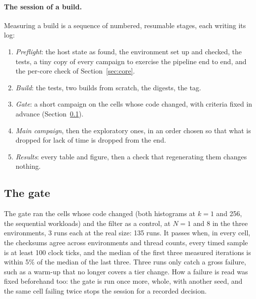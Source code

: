 \paragraph{The session of a build.} Measuring a build is a sequence of
numbered, resumable stages, each writing its log:
\begin{enumerate}[leftmargin=2em]
\item \emph{Preflight}: the host state as found, the environment set up and
checked, the tests, a tiny copy of every campaign to exercise the pipeline
end to end, and the per-core check of Section~\ref{sec:core}.
\item \emph{Build}: the tests, two builds from scratch, the digests, the
tag.
\item \emph{Gate}: a short campaign on the cells whose code changed, with
criteria fixed in advance (Section~\ref{sec:gate}).
\item \emph{Main campaign}, then the exploratory ones, in an order chosen so
that what is dropped for lack of time is dropped from the end.
\item \emph{Results}: every table and figure, then a check that
regenerating them changes nothing.
\end{enumerate}

\subsection{The gate}
\label{sec:gate}

The gate ran the cells whose code changed (both histograms at $k=1$ and
256, the sequential workloads) and the filter as a control, at $N=1$ and 8
in the three environments, 3 runs each at the real size: 135 runs. It
passes when, in every cell, the checksums agree across environments and
thread counts, every timed sample is at least 100 clock ticks, and the
median of the first three measured iterations is within 5\% of the median
of the last three. Three runs only catch a gross failure, such as a warm-up
that no longer covers a tier change. How a failure is read was fixed
beforehand too: the gate is run once more, whole, with another seed, and
the same cell failing twice stops the session for a recorded decision.

